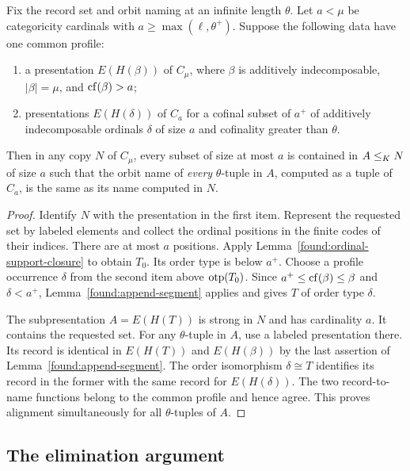 \begin{proposition}
\label{found:alignment}
Fix the record set and orbit naming at an infinite length
$\theta$. Let $a<\mu$ be categoricity cardinals with
$a\geq\max(\ell,\theta^+)$. Suppose the following data
have one common profile:
\begin{enumerate}
\item a presentation $E(H(\beta))$ of $C_\mu$, where
$\beta$ is additively indecomposable, $|\beta|=\mu$,
and $\operatorname{cf}(\beta)>a$;
\item presentations $E(H(\delta))$ of $C_a$ for a
cofinal subset of $a^+$ of additively indecomposable
ordinals $\delta$ of size $a$ and cofinality greater
than $\theta$.
\end{enumerate}
Then in any copy $N$ of $C_\mu$, every subset of size
at most $a$ is contained in $A\leq_K N$ of size $a$
such that the orbit name of \emph{every} $\theta$-tuple
in $A$, computed as a tuple of $C_a$, is the same as
its name computed in $N$.
\end{proposition}

\begin{proof}
Identify $N$ with the presentation in the first item.
Represent the requested set by labeled elements and
collect the ordinal positions in the finite codes of
their indices. There are at most $a$ positions. Apply
Lemma~\ref{found:ordinal-support-closure} to obtain
$T_0$. Its order type is below $a^+$. Choose a
profile occurrence $\delta$ from the second item above
$\operatorname{otp}(T_0)$. Since $a^+\leq\operatorname{cf}(\beta)\leq\beta$ and
$\delta<a^+$, Lemma~\ref{found:append-segment} applies
and gives $T$ of order type $\delta$.

The subpresentation $A=E(H(T))$ is strong in $N$ and
has cardinality $a$. It contains the requested set.
For any $\theta$-tuple in $A$, use a labeled
presentation there. Its record is identical in
$E(H(T))$ and $E(H(\beta))$ by the last assertion of
Lemma~\ref{found:append-segment}. The order isomorphism
$\delta\cong T$ identifies its record in the former
with the same record for $E(H(\delta))$. The two
record-to-name functions belong to the common profile
and hence agree. This proves alignment simultaneously
for all $\theta$-tuples of $A$.
\end{proof}

\subsection{The elimination argument}

